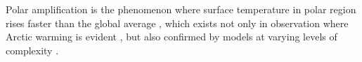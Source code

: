 

 

Polar amplification is the phenomenon where surface temperature in polar region rises faster than the global average \citep{IPCC2007Synth,Stocker2013}, which exists not only in observation where Arctic warming is evident \citep{Johannessen2004,Polyakov2002}, but also confirmed by models at varying levels of complexity \citep[e.g.,][]{Winton2006amplified,Langen2007,Merlis2018,Alexeev2005}.

